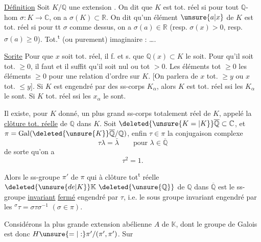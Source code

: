 \uline{Définition} Soit $K/\mathbb Q$ une extension  . On dit
que $K$ est tot. réel si pour tout $\mathbb Q$-hom $\sigma:K\to\mathbb C$,
on a $\sigma(K)\subset\mathbb R$. On dit qu'un élément $\unsure{a|x}$ de $K$ est
tot. réel  si pour tt $\sigma$ comme dessus, on a
$\sigma(a)\in\mathbb R$ (resp. $\sigma(x)>0$, resp. $\sigma(a)\ge0$). Tot.\textsuperscript{t} (ou purement)
imaginaire : \ldots .

\uline{Sorite} Pour que $x$ soit tot. réel, il f. et s. que
$\mathbb Q(x)\subset K$ le soit. Pour qu'il soit tot. $\ge0$, il faut et
il suffit qu'il soit nul ou tot $>0$. Les éléments
tot $\ge0$   les éléments $\ge0$ pour une relation
d'ordre sur $K$. [On parlera de $x$ tot. $\ge y$ ou
$x$ tot. $\le y$]. Si $K$ est engendré par des ss-corps
$K_\alpha$, alors $K$ est tot. réel ssi les $K_\alpha$ le sont. Si
$K$ tot. réel ssi  les $x_\alpha$ le sont.

Il existe, pour $K$ donné, un plus grand ss-corps
totalement réel de $K$, appelé la \uline{clôture tot. réelle} de
$\mathbb Q$ dans $K$. Soit $\deleted{\unsure{K=|K}}\overline{\mathbb Q}\subset\mathbb C$, et $\pi=\operatorname{Gal}(\deleted{\unsure{K}}\overline{\mathbb Q}/\mathbb Q)$,
enfin $\tau\in\pi$ la conjugaison complexe
\[
\tau\lambda=\bar\lambda\qquad \text{pour }\lambda\in\overline{\mathbb Q}
\]
de sorte qu'on a
\[
\tau^2=1.
\]

Alors le ss-groupe $\pi'$ de $\pi$ qui   à clôture
tot\textsuperscript{t} réelle $\deleted{\unsure{de|K}}\mathbb K\ \deleted{\unsure{\mathbb Q}}$ de $\mathbb Q$ dans $\overline{\mathbb Q}$ est  le ss-groupe
\uline{invariant} \uline{fermé} engendré par $\tau$, i.e. le sous groupe invariant
engendré par les $ {}^{\sigma}\tau=\sigma\tau\sigma^{-1}$ $(\sigma\in\pi)$.

Considérons la plus grande extension abélienne
$A$ de $\mathbb K$, dont le groupe de Galois est donc $H\unsure{=|:}\pi'/(\pi',\pi')$.  Sur
